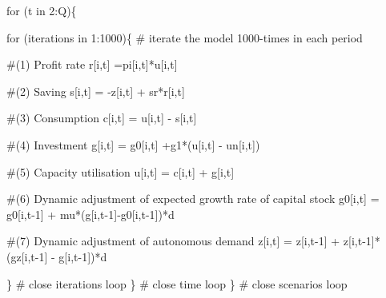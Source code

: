 \documentclass[
  letterpaper,
  DIV=11,
  numbers=noendperiod]{scrreprt}
\newenvironment{Shaded}{\begin{snugshade}}{\end{snugshade}}
\newcommand{\CommentTok}[1]{\textcolor[rgb]{0.37,0.37,0.37}{#1}}
\newcommand{\ControlFlowTok}[1]{\textcolor[rgb]{0.00,0.23,0.31}{#1}}
\newcommand{\DecValTok}[1]{\textcolor[rgb]{0.68,0.00,0.00}{#1}}
\newcommand{\NormalTok}[1]{\textcolor[rgb]{0.00,0.23,0.31}{#1}}
\newcommand{\OtherTok}[1]{\textcolor[rgb]{0.00,0.23,0.31}{#1}}
\newcommand{\SpecialCharTok}[1]{\textcolor[rgb]{0.37,0.37,0.37}{#1}}
\begin{document}
\begin{Shaded}
\begin{Highlighting}[]
  \ControlFlowTok{for}\NormalTok{ (t }\ControlFlowTok{in} \DecValTok{2}\SpecialCharTok{:}\NormalTok{Q)\{}
    
    \ControlFlowTok{for}\NormalTok{ (iterations }\ControlFlowTok{in} \DecValTok{1}\SpecialCharTok{:}\DecValTok{1000}\NormalTok{)\{ }\CommentTok{\# iterate the model 1000{-}times in each period}
    
    \CommentTok{\#(1) Profit rate}
\NormalTok{    r[i,t] }\OtherTok{=}\NormalTok{pi[i,t]}\SpecialCharTok{*}\NormalTok{u[i,t]}
      
    \CommentTok{\#(2) Saving}
\NormalTok{    s[i,t] }\OtherTok{=} \SpecialCharTok{{-}}\NormalTok{z[i,t] }\SpecialCharTok{+}\NormalTok{ sr}\SpecialCharTok{*}\NormalTok{r[i,t]}
    
    \CommentTok{\#(3) Consumption}
\NormalTok{    c[i,t] }\OtherTok{=}\NormalTok{ u[i,t] }\SpecialCharTok{{-}}\NormalTok{ s[i,t]}
    
    \CommentTok{\#(4) Investment}
\NormalTok{    g[i,t] }\OtherTok{=}\NormalTok{ g0[i,t] }\SpecialCharTok{+}\NormalTok{g1}\SpecialCharTok{*}\NormalTok{(u[i,t] }\SpecialCharTok{{-}}\NormalTok{ un[i,t])}
    
    \CommentTok{\#(5) Capacity utilisation}
\NormalTok{    u[i,t] }\OtherTok{=}\NormalTok{ c[i,t] }\SpecialCharTok{+}\NormalTok{ g[i,t]}
    
    \CommentTok{\#(6) Dynamic adjustment of expected growth rate of capital stock}
\NormalTok{    g0[i,t] }\OtherTok{=}\NormalTok{ g0[i,t}\DecValTok{{-}1}\NormalTok{] }\SpecialCharTok{+}\NormalTok{ mu}\SpecialCharTok{*}\NormalTok{(g[i,t}\DecValTok{{-}1}\NormalTok{]}\SpecialCharTok{{-}}\NormalTok{g0[i,t}\DecValTok{{-}1}\NormalTok{])}\SpecialCharTok{*}\NormalTok{d}
    
    \CommentTok{\#(7) Dynamic adjustment of autonomous demand}
\NormalTok{    z[i,t] }\OtherTok{=}\NormalTok{ z[i,t}\DecValTok{{-}1}\NormalTok{] }\SpecialCharTok{+}\NormalTok{ z[i,t}\DecValTok{{-}1}\NormalTok{]}\SpecialCharTok{*}\NormalTok{(gz[i,t}\DecValTok{{-}1}\NormalTok{] }\SpecialCharTok{{-}}\NormalTok{ g[i,t}\DecValTok{{-}1}\NormalTok{])}\SpecialCharTok{*}\NormalTok{d}

\NormalTok{  \} }\CommentTok{\# close iterations loop}
\NormalTok{ \}  }\CommentTok{\# close time loop}
\NormalTok{\}   }\CommentTok{\# close scenarios loop}
\end{Highlighting}
\end{Shaded}
\end{document}
